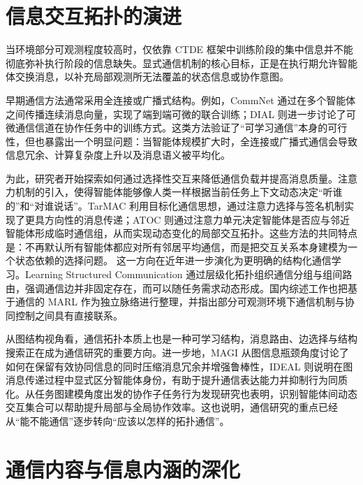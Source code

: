 \section{信息交互拓扑的演进}

当环境部分可观测程度较高时，仅依靠 CTDE 框架中训练阶段的集中信息并不能彻底弥补执行阶段的信息缺失。显式通信机制的核心目标，正是在执行期允许智能体交换消息，以补充局部观测所无法覆盖的状态信息或协作意图。

早期通信方法通常采用全连接或广播式结构。例如，CommNet 通过在多个智能体之间传播连续消息向量，实现了端到端可微的联合训练\cite{sukhbaatar2016commnet}；DIAL 则进一步讨论了可微通信信道在协作任务中的训练方式\cite{foerster2016dial}。这类方法验证了“可学习通信”本身的可行性，但也暴露出一个明显问题：当智能体规模扩大时，全连接或广播式通信会导致信息冗余、计算复杂度上升以及消息语义被平均化。

为此，研究者开始探索如何通过选择性交互来降低通信负载并提高消息质量。注意力机制的引入，使得智能体能够像人类一样根据当前任务上下文动态决定“听谁的”和“对谁说话”。TarMAC 利用目标化通信思想，通过注意力选择与签名机制实现了更具方向性的消息传递\cite{das2019tarmac}；ATOC 则通过注意力单元决定智能体是否应与邻近智能体形成临时通信组，从而实现动态变化的局部交互拓扑\cite{jiang2018attentional}。这些方法的共同特点是：不再默认所有智能体都应对所有邻居平均通信，而是把交互关系本身建模为一个状态依赖的选择问题。
这一方向在近年进一步演化为更明确的结构化通信学习。Learning Structured Communication 通过层级化拓扑组织通信分组与组间路由，强调通信边并非固定存在，而可以随任务需求动态形成\cite{sheng2023lsc}。国内综述工作也把基于通信的 MARL 作为独立脉络进行整理，并指出部分可观测环境下通信机制与协同控制之间具有直接联系\cite{wang2022commmarl_cn}。

从图结构视角看，通信拓扑本质上也是一种可学习结构，消息路由、边选择与结构搜索正在成为通信研究的重要方向。进一步地，MAGI 从图信息瓶颈角度讨论了如何在保留有效协同信息的同时压缩消息冗余并增强鲁棒性\cite{ding2024magi}，IDEAL 则说明在图消息传递过程中显式区分智能体身份，有助于提升通信表达能力并抑制行为同质化\cite{du2024ideal}。从任务图建模角度出发的协作子任务行为发现研究也表明，识别智能体间动态交互集合可以帮助提升局部与全局协作效率\cite{li2024csp_cn}。这也说明，通信研究的重点已经从“能不能通信”逐步转向“应该以怎样的拓扑通信”。

\section{通信内容与信息内涵的深化}

